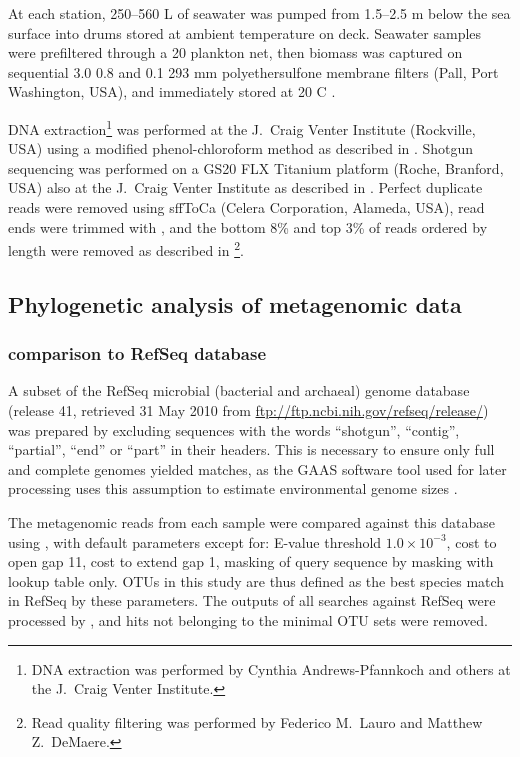

At each station, \textapprox{}250--560 L of seawater was pumped from \textapprox{}1.5--2.5 m below the sea surface into drums stored at ambient temperature on deck. 
Seawater samples were prefiltered through a 20 \micron{} plankton net, then biomass was captured on sequential 3.0 \micron{} 0.8 \micron{} and 0.1 \micron{} 293 mm polyethersulfone membrane filters (Pall, Port Washington, USA), and immediately stored at \textminus{}20 \textdegree{}C \cite{Rusch:2007ez,Ng:2010cd}.

DNA extraction\footnote{DNA extraction was performed by Cynthia Andrews-Pfannkoch and others at the J.\ Craig Venter Institute.} was performed at the J.\ Craig Venter Institute (Rockville, USA) using a modified phenol-chloroform method as described in \citet{Rusch:2007ez}.
Shotgun sequencing was performed on a GS20 FLX Titanium platform (Roche, Branford, USA) also at the J.\ Craig Venter Institute as described in \citet{Lauro:2010jna}.
Perfect duplicate reads were removed using sffToCa (Celera Corporation, Alameda, USA),  read ends were trimmed with  \cite{Chou:2001ck}, and the bottom 8\% and top 3\% of reads ordered by length were removed as described in \citet{Lauro:2010jna}\footnote{Read quality filtering was performed by Federico M.\ Lauro and Matthew Z.\ DeMaere.}.

\subsection{Phylogenetic analysis of metagenomic data}

\subsubsection{ comparison to RefSeq database}

A subset of the RefSeq microbial (bacterial and archaeal) genome database (release 41, retrieved 31 May 2010 from \url{ftp://ftp.ncbi.nih.gov/refseq/release/}) was prepared by excluding sequences with the words ``shotgun'', ``contig'', ``partial'', ``end'' or ``part'' in their headers.
This is necessary to ensure only full and complete genomes yielded matches, as the \ac{GAAS} software tool used for later processing uses this assumption to estimate environmental genome sizes \citep[following][]{Angly:2009ip}.

The metagenomic reads from each sample were compared against this database using , with default parameters except for: E-value threshold $1.0\times{}10^{-3}$, cost to open gap 11, cost to extend gap 1, masking of query sequence by  masking with lookup table only.
\acp{OTU} in this study are thus defined as the best species match in RefSeq by these parameters.
The outputs of all  searches against RefSeq were processed by , and hits not belonging to the minimal \ac{OTU} sets were removed.


